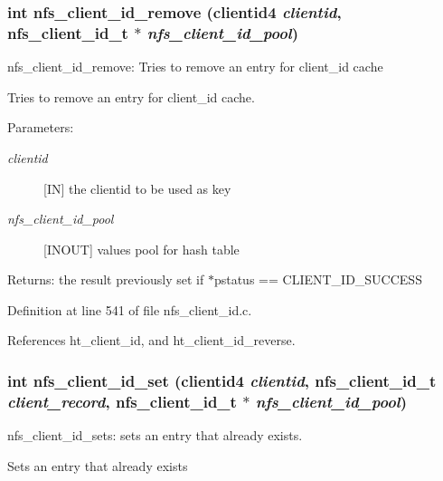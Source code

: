 \subsubsection{\setlength{\rightskip}{0pt plus 5cm}int nfs\_\-client\_\-id\_\-remove (clientid4 {\em clientid}, nfs\_\-client\_\-id\_\-t $\ast$ {\em nfs\_\-client\_\-id\_\-pool})}\label{nfs__client__id_8c_a17}


nfs\_\-client\_\-id\_\-remove: Tries to remove an entry for client\_\-id cache

Tries to remove an entry for client\_\-id cache.

\begin{Desc}
\item[Parameters:]
\begin{description}
\item[{\em clientid}][IN] the clientid to be used as key \item[{\em nfs\_\-client\_\-id\_\-pool}][INOUT] values pool for hash table\end{description}
\end{Desc}
\begin{Desc}
\item[Returns:]the result previously set if $\ast$pstatus == CLIENT\_\-ID\_\-SUCCESS \end{Desc}


Definition at line 541 of file nfs\_\-client\_\-id.c.

References ht\_\-client\_\-id, and ht\_\-client\_\-id\_\-reverse.
\subsubsection{\setlength{\rightskip}{0pt plus 5cm}int nfs\_\-client\_\-id\_\-set (clientid4 {\em clientid}, nfs\_\-client\_\-id\_\-t {\em client\_\-record}, nfs\_\-client\_\-id\_\-t $\ast$ {\em nfs\_\-client\_\-id\_\-pool})}\label{nfs__client__id_8c_a14}


nfs\_\-client\_\-id\_\-sets: sets an entry that already exists.

Sets an entry that already exists

